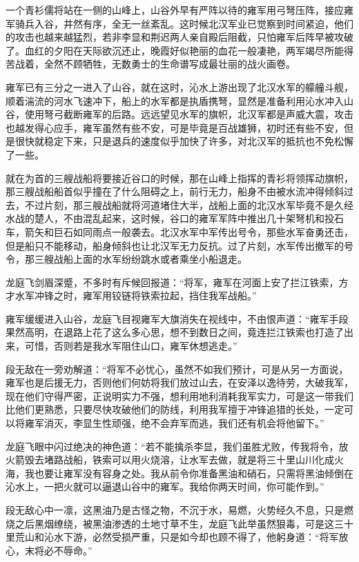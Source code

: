 一个青衫儒将站在一侧的山峰上，山谷外早有严阵以待的雍军用弓弩压阵，接应雍军骑兵入谷，井然有序，全无一丝紊乱。这时候北汉军业已觉察到时间紧迫，他们的攻击也越来越猛烈，若非李显和荆迟两人亲自殿后阻截，只怕雍军后阵早被攻破了。血红的夕阳在天际欲沉还止，晚霞好似艳丽的血花一般凄艳，两军竭尽所能得苦战着，全然不顾牺牲，无数勇士的生命谱写成最壮丽的战火画卷。

雍军已有三分之一进入了山谷，就在这时，沁水上游出现了北汉水军的艨艟斗舰，顺着湍流的河水飞速冲下，船上的水军都是执盾携弩，显然是准备利用沁水冲入山谷，使用弩弓截断雍军的后路。远远望见水军的旗帜，北汉军都是声威大震，攻击也越发得心应手，雍军虽然有些不安，可是毕竟是百战雄狮，初时还有些不安，但是很快就稳定下来，只是退兵的速度似乎加快了许多，对北汉军的抵抗也不免松懈了一些。

就在为首的三艘战船将要接近谷口的时候，那在山峰上指挥的青衫将领挥动旗帜，那三艘战船船首似乎撞在了什么阻碍之上，前行无力，船身不由被水流冲得倾斜过去，不过片刻，那三艘战船就将河道堵住大半，战船上面的北汉水军毕竟不是久经水战的楚人，不由混乱起来，这时候，谷口的雍军军阵中推出几十架弩机和投石车，箭矢和巨石如同雨点一般袭去。北汉水军中军传出号令，那些水军奋勇还击，但是船只不能移动，船身倾斜也让北汉军无力反抗。过了片刻，水军传出撤军的号令，那三艘战船上面的水军纷纷跳水或者乘坐小船退走。

龙庭飞剑眉深蹙，不多时有斥候回报道：“将军，雍军在河面上安了拦江铁索，方才水军冲锋之时，雍军用铰链将铁索拉起，挡住我军战船。”

雍军缓缓进入山谷，龙庭飞目视雍军大旗消失在视线中，不由恨声道：“雍军手段果然高明，在退路上花了这么多心思，想不到数日之间，竟连拦江铁索也打造了出来，可惜，否则若是我水军阻住山口，雍军休想逃走。”

段无敌在一旁劝解道：“将军不必忧心，虽然不如我们预计，可是从另一方面说，雍军也是后援无力，否则他们何妨将我们放过山去，在安泽以逸待劳，大破我军，现在他们守得严密，正说明实力不强，想利用地利消耗我军实力，可是这一带我们比他们更熟悉，只要尽快攻破他们的防线，利用我军擅于冲锋追猎的长处，一定可以将雍军消灭，李显生性顽强，绝不会弃军而逃，我们还有机会将他留下。”

龙庭飞眼中闪过绝决的神色道：“若不能擒杀李显，我们虽胜尤败，传我将令，放火箭毁去堵路战船，铁索可以用火烧溶，让水军去做，就是将三十里山川化成火海，我也要让雍军没有容身之处。我从前令你准备黑油和硝石，只需将黑油倾倒在沁水上，一把火就可以逼退山谷中的雍军。我给你两天时间，你可能作到。”

段无敌心中一凛，这黑油乃是古怪之物，不沉于水，易燃，火势经久不息，只是燃烧之后黑烟缭绕，被黑油渗透的土地寸草不生，龙庭飞此举虽然狠毒，可是这三十里荒山和沁水下游，必然受损严重，只是如今却也顾不得了，他躬身道：“将军放心，末将必不辱命。”

